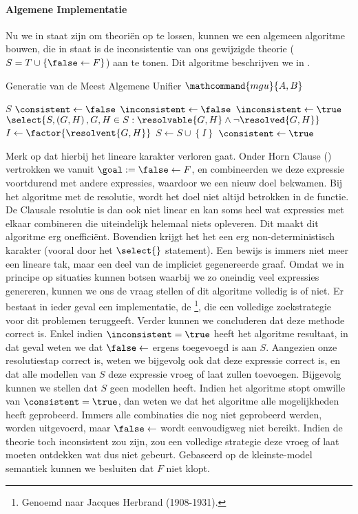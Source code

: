 \paragraph{Algemene Implementatie}
Nu we in staat zijn om theori\"en op te lossen, kunnen we een algemeen algoritme bouwen, die in staat is de inconsistentie van ons gewijzigde theorie ($S=T\cup\left\{\false\leftarrow F\right\}$) aan te tonen. Dit algoritme beschrijven we in .
\begin{algorithm}[htb]
\caption{Generatie van de Meest Algemene Unifier $\mathcommand{mgu}{A,B}$}
\label{alg:resolutionSolver}
\begin{algorithmic}[1]
\REQUIRE$S$
\STATE $\consistent\leftarrow\false$
\STATE $\inconsistent\leftarrow\false$
\WHILE{$\neg\consistent\wedge\neg\inconsistent$}
\STATE$\inconsistent\leftarrow\true$
\STATE$\select{S,\left(G,H\right),G,H\in S:\resolvable{G,H}\wedge\neg\resolved{G,H}}$
\STATE$I\leftarrow\factor{\resolvent{G,H}}$
\STATE$S\leftarrow S\cup\left\{I\right\}$
\ELSE
\STATE$\consistent\leftarrow\true$
\ENDIF
\ENDWHILE
\end{algorithmic}
\end{algorithm}
Merk op dat hierbij het lineare karakter verloren gaat. Onder Horn Clause () vertrokken we vanuit $\goal:=\false\leftarrow F$, en combineerden we deze expressie voortdurend met andere expressies, waardoor we een nieuw doel bekwamen. Bij het algoritme met de resolutie, wordt het doel niet altijd betrokken in de functie. De Clausale resolutie is dan ook niet linear en kan soms heel wat expressies met elkaar combineren die uiteindelijk helemaal niets opleveren. Dit maakt dit algoritme erg oneffici\"ent. Bovendien krijgt het het een erg non-deterministisch karakter (vooral door het $\select{}$ statement). Een bewijs is immers niet meer een lineare tak, maar een deel van de impliciet gegenereerde graaf. Omdat we in principe op situaties kunnen botsen waarbij we zo oneindig veel expressies genereren, kunnen we ons de vraag stellen of dit algoritme volledig is of niet. Er bestaat in ieder geval een implementatie, de \footnote{Genoemd naar Jacques Herbrand (1908-1931).}, die een volledige zoekstrategie voor dit problemen teruggeeft.
Verder kunnen we concluderen dat deze methode correct is. Enkel indien $\inconsistent=\true$ heeft het algoritme resultaat, in dat geval weten we dat $\false\leftarrow$ ergens toegevoegd is aan $S$. Aangezien onze resolutiestap correct is, weten we bijgevolg ook dat deze expressie correct is, en dat alle modellen van $S$ deze expressie vroeg of laat zullen toevoegen. Bijgevolg kunnen we stellen dat $S$ geen modellen heeft. Indien het algoritme stopt omwille van $\consistent=\true$, dan weten we dat het algoritme alle mogelijkheden heeft geprobeerd. Immers alle combinaties die nog niet geprobeerd werden, worden uitgevoerd, maar $\false\leftarrow$ wordt eenvoudigweg niet bereikt. Indien de theorie toch inconsistent zou zijn, zou een volledige strategie deze vroeg of laat moeten ontdekken wat dus niet gebeurt. Gebaseerd op de kleinste-model semantiek kunnen we besluiten dat $F$ niet klopt.
